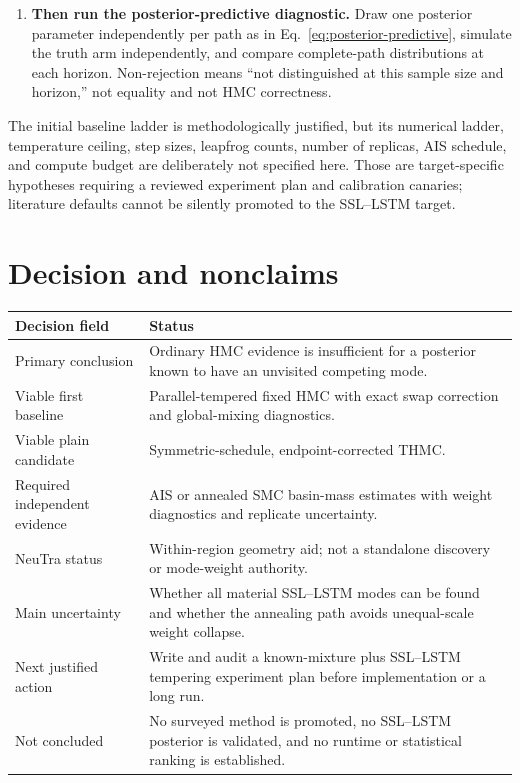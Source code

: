 \documentclass[11pt]{article}
\begin{document}
\begin{enumerate}
  \item \textbf{Then run the posterior-predictive diagnostic.}  Draw one posterior
  parameter independently per path as in Eq.~\eqref{eq:posterior-predictive}, simulate
  the truth arm independently, and compare complete-path distributions at each
  horizon.  Non-rejection means ``not distinguished at this sample size and horizon,''
  not equality and not HMC correctness.
\end{enumerate}

The initial baseline ladder is methodologically justified, but its numerical ladder,
temperature ceiling, step sizes, leapfrog counts, number of replicas, AIS schedule,
and compute budget are deliberately not specified here.  Those are target-specific
hypotheses requiring a reviewed experiment plan and calibration canaries; literature
defaults cannot be silently promoted to the SSL--LSTM target.

\section{Decision and nonclaims}

\begin{center}
\begin{tabularx}{\textwidth}{p{}X}
\toprule
Decision field & Status \\
\midrule
Primary conclusion & Ordinary HMC evidence is insufficient for a posterior known to have an unvisited competing mode. \\
Viable first baseline & Parallel-tempered fixed HMC with exact swap correction and global-mixing diagnostics. \\
Viable plain candidate & Symmetric-schedule, endpoint-corrected THMC. \\
Required independent evidence & AIS or annealed SMC basin-mass estimates with weight diagnostics and replicate uncertainty. \\
NeuTra status & Within-region geometry aid; not a standalone discovery or mode-weight authority. \\
Main uncertainty & Whether all material SSL--LSTM modes can be found and whether the annealing path avoids unequal-scale weight collapse. \\
Next justified action & Write and audit a known-mixture plus SSL--LSTM tempering experiment plan before implementation or a long run. \\
Not concluded & No surveyed method is promoted, no SSL--LSTM posterior is validated, and no runtime or statistical ranking is established. \\
\bottomrule
\end{tabularx}
\end{center}
\end{document}
